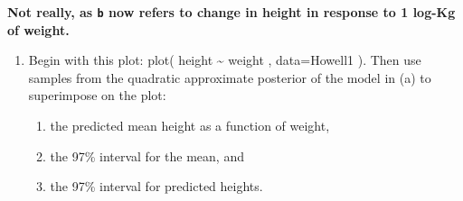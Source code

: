 \documentclass[
]{book}
\providecommand{\tightlist}{%
  \setlength{\itemsep}{0pt}\setlength{\parskip}{0pt}}
\begin{document}
\textbf{Not really, as \texttt{b} now refers to change in height in response to 1 log-Kg of weight.}

\begin{enumerate}
\def\labelenumi{(\alph{enumi})}
\setcounter{enumi}{1}
\tightlist
\item
  Begin with this plot: plot( height \textasciitilde{} weight , data=Howell1 ). Then use samples from the quadratic approximate posterior of the model in (a) to superimpose on the plot:

  \begin{enumerate}
  \def\labelenumii{(\arabic{enumii})}
  \tightlist
  \item
    the predicted mean height as a function of weight,
  \item
    the 97\% interval for the mean, and
  \item
    the 97\% interval for predicted heights.
  \end{enumerate}
\end{enumerate}
\end{document}
